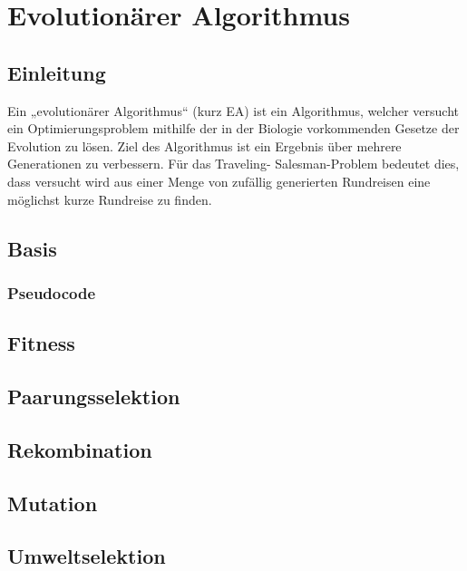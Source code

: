 \section{Evolutionärer Algorithmus}
\subsection{Einleitung}
Ein „evolutionärer Algorithmus“ (kurz EA) ist ein Algorithmus, welcher 
versucht ein Optimierungsproblem mithilfe der in der Biologie 
vorkommenden Gesetze der Evolution zu lösen. Ziel des Algorithmus ist
ein Ergebnis über mehrere Generationen zu verbessern. Für das Traveling-
Salesman-Problem bedeutet dies, dass versucht wird aus einer Menge
von zufällig generierten Rundreisen eine möglichst kurze Rundreise zu
finden.

\subsection{Basis}
\subsubsection{Pseudocode}
\subsection{Fitness}
\subsection{Paarungsselektion}
\subsection{Rekombination}
\subsection{Mutation}
\subsection{Umweltselektion}
